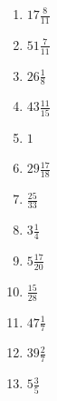 \documentclass[12pt]{article}
\begin{document}
\begin{enumerate}
\item $ 17 \frac{8}{11} $
\item $ 51 \frac{7}{11} $
\item $ 26 \frac{1}{8} $
\item $ 43 \frac{11}{15} $
\item $ 1 $
\item $ 29 \frac{17}{18} $
\item $ \frac{25}{33} $
\item $ 3 \frac{1}{4} $
\item $ 5 \frac{17}{20} $
\item $ \frac{15}{28} $
\item $ 47 \frac{1}{7} $
\item $ 39 \frac{2}{7} $
\item $ 5 \frac{3}{5} $
\end{enumerate}
\newpage
\end{document}

